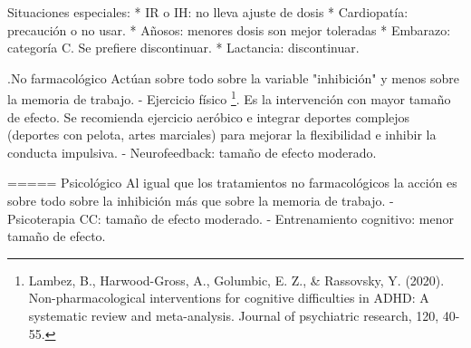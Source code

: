 Situaciones especiales:
* IR o IH: no lleva ajuste de dosis
* Cardiopatía: precaución o no usar.
* Añosos: menores dosis son mejor toleradas
* Embarazo: categoría C. Se prefiere discontinuar.
* Lactancia: discontinuar.

.No farmacológico
Actúan sobre todo sobre la variable "inhibición" y menos sobre la memoria de trabajo.
- Ejercicio físico \footnote{Lambez, B., Harwood-Gross, A., Golumbic, E. Z., \& Rassovsky, Y. (2020). Non-pharmacological interventions for cognitive difficulties in ADHD: A systematic review and meta-analysis. Journal of psychiatric research, 120, 40-55.}. Es la intervención con mayor tamaño de efecto. Se recomienda ejercicio aeróbico e integrar deportes complejos (deportes con pelota, artes marciales) para mejorar la flexibilidad e inhibir la conducta impulsiva.
- Neurofeedback: tamaño de efecto moderado.

===== Psicológico
Al igual que los tratamientos no farmacológicos la acción es sobre todo sobre la inhibición más que sobre la memoria de trabajo.
- Psicoterapia CC: tamaño de efecto moderado.
- Entrenamiento cognitivo: menor tamaño de efecto.